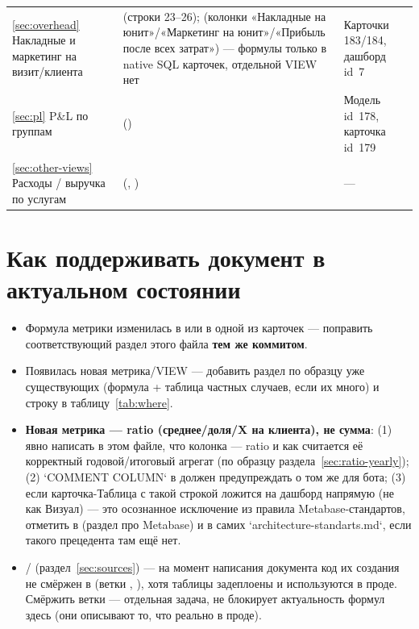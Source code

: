 \documentclass[11pt,a4paper]{article}
\begin{document}
\begin{longtable}{@{}L{4cm}L{7.3cm}L{4cm}@{}}
\ref{sec:overhead} Накладные и маркетинг на визит/клиента &
  \texttt{} (строки 23--26);
  \texttt{} (колонки «Накладные на юнит»/«Маркетинг
  на юнит»/«Прибыль после всех затрат») — формулы только в native SQL
  карточек, отдельной VIEW нет & Карточки 183/184, дашборд id~7 \\
\ref{sec:pl} P\&L по группам & \texttt{}
  (\texttt{}) & Модель id~178, карточка id~179 \\
\ref{sec:other-views} Расходы / выручка по услугам &
  \texttt{}
  (\texttt{}, \texttt{}) & --- \\
\end{longtable}
\normalsize

\section{Как поддерживать документ в актуальном состоянии}
\label{sec:maintain}

\begin{itemize}[leftmargin=*]
\item Формула метрики изменилась в \texttt{}
  или в одной из карточек \texttt{} ---
  поправить соответствующий раздел этого файла \textbf{тем же коммитом}.
\item Появилась новая метрика/VIEW --- добавить раздел по образцу уже
  существующих (формула + таблица частных случаев, если их много) и
  строку в таблицу~\ref{tab:where}.
\item \textbf{Новая метрика --- ratio (среднее/доля/X на клиента), не
  сумма}: (1) явно написать в этом файле, что колонка --- ratio и как
  считается её корректный годовой/итоговый агрегат (по образцу
  раздела~\ref{sec:ratio-yearly}); (2) `COMMENT COLUMN` в
  \texttt{} должен предупреждать о том же для
  бота; (3) если карточка-Таблица с такой строкой ложится на дашборд
  напрямую (не как Визуал) --- это осознанное исключение из правила
  Metabase-стандартов, отметить в \texttt{} (раздел
  про Metabase) и в самих `architecture-standarts.md`, если такого
  прецедента там ещё нет.
\item \texttt{}/\allowbreak\texttt{}
  (раздел~\ref{sec:sources}) --- на момент написания документа код их
  создания не смёржен в \texttt{} (ветки \texttt{},
  \texttt{}), хотя таблицы задеплоены и
  используются в проде. Смёржить ветки --- отдельная задача, не блокирует
  актуальность формул здесь (они описывают то, что реально в проде).
\end{itemize}
\end{document}
